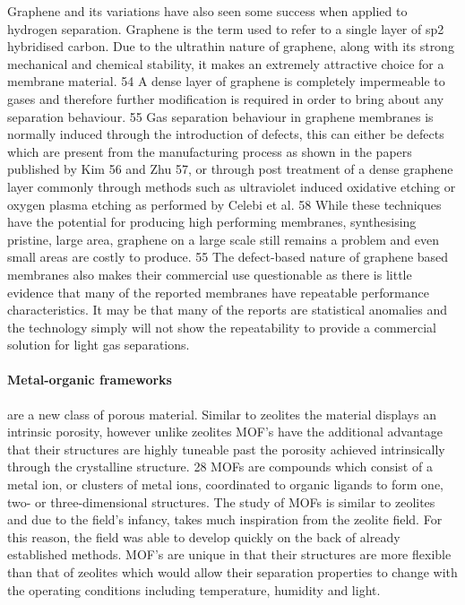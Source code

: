Graphene and its variations have also seen some success when applied to hydrogen separation. 
Graphene is the term used to refer to a single layer of sp2 hybridised carbon. Due to the 
ultrathin nature of graphene, along with its strong mechanical and chemical stability, it 
makes an extremely attractive choice for a membrane material. 54 A dense layer of graphene 
is completely impermeable to gases and therefore further modification is required in order 
to bring about any separation behaviour. 55 Gas separation behaviour in graphene membranes 
is normally induced through the introduction of defects, this can either be defects which 
are present from the manufacturing process as shown in the papers published by Kim 56 and Zhu 57, 
or through post treatment of a dense graphene layer commonly through methods such as 
ultraviolet induced oxidative etching or oxygen plasma etching as performed by Celebi et al. 
58 While these techniques have the potential for producing high performing membranes, 
synthesising pristine, large area, graphene on a large scale still remains a problem and 
even small areas are costly to produce. 55  The defect-based nature of graphene based 
membranes also makes their commercial use questionable as there is little evidence that 
many of the reported membranes have repeatable performance characteristics. It may be that 
many of the reports are statistical anomalies and the technology simply will not show the 
repeatability to provide a commercial solution for light gas separations.

\paragraph{Metal-organic frameworks} are a new class of porous material. Similar to zeolites 
the material displays an intrinsic porosity, however unlike zeolites MOF’s have the additional 
advantage that their structures are highly tuneable past the porosity achieved intrinsically 
through the crystalline structure. 28 MOFs are compounds which consist of a metal ion, or 
clusters of metal ions, coordinated to organic ligands to form one, two- or three-dimensional 
structures. The study of MOFs is similar to zeolites and due to the field’s infancy, takes 
much inspiration from the zeolite field. For this reason, the field was able to develop 
quickly on the back of already established methods. MOF’s are unique in that their structures 
are more flexible than that of zeolites which would allow their separation properties to 
change with the operating conditions including temperature, humidity and light. 


